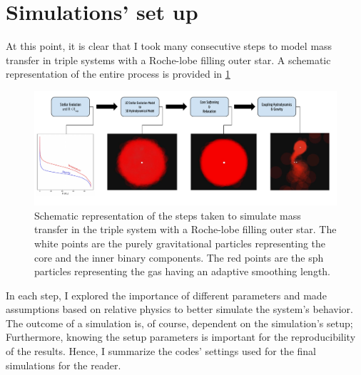 \section{Simulations' set up}

At this point, it is clear that I took many consecutive steps to model mass transfer in triple systems with a Roche-lobe filling outer star. A schematic representation of the entire process is provided in \cref{fig:schematic_method}
\begin{figure}[H]
    \centering
    \includegraphics[width=\textwidth]{Thesis/figures/method_schematic.pdf}
    \caption{Schematic representation of the steps taken to simulate mass transfer in the triple system with a Roche-lobe filling outer star. The white points are the purely gravitational particles representing the core and the inner binary components. The red points are the \ac{sph} particles representing the gas having an adaptive smoothing length.}
    \label{fig:schematic_method}
\end{figure}
In each step, I explored the importance of different parameters and made assumptions based on relative physics to better simulate the system's behavior. The outcome of a simulation is, of course, dependent on the simulation's setup; Furthermore, knowing the setup parameters is important for the reproducibility of the results. Hence, I summarize the codes' settings used for the final simulations for the reader.
